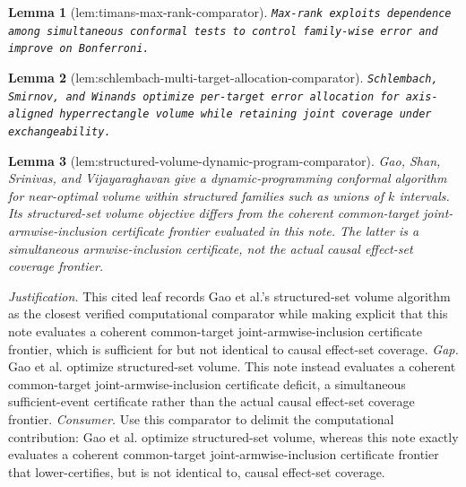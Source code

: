\documentclass{article}
\newtheorem{lemma}{Lemma}
\begin{document}
\begin{lemma}[lem:timans-max-rank-comparator]\label{lem:timans-max-rank-comparator}
\texttt{Max-\allowbreak{}rank exploits dependence among simultaneous conformal tests to control family-\allowbreak{}wise error and improve on Bonferroni.}
\end{lemma}

\begin{lemma}[lem:schlembach-multi-target-allocation-comparator]\label{lem:schlembach-multi-target-allocation-comparator}
\texttt{Schlembach,\allowbreak{} Smirnov,\allowbreak{} and Winands optimize per-\allowbreak{}target error allocation for axis-\allowbreak{}aligned hyperrectangle volume while retaining joint coverage under exchangeability.}
\end{lemma}

\begin{lemma}[lem:structured-volume-dynamic-program-comparator]\label{lem:structured-volume-dynamic-program-comparator}
Gao, Shan, Srinivas, and Vijayaraghavan give a dynamic-programming conformal algorithm for near-optimal volume within structured families such as unions of \(k\) intervals. Its structured-set volume objective differs from the coherent common-target joint-armwise-inclusion certificate frontier evaluated in this note. The latter is a simultaneous armwise-inclusion certificate, not the actual causal effect-set coverage frontier.
\end{lemma}
\par\smallskip\noindent \textit{Justification.} This cited leaf records Gao et al.'s structured-set volume algorithm as the closest verified computational comparator while making explicit that this note evaluates a coherent common-target joint-armwise-inclusion certificate frontier, which is sufficient for but not identical to causal effect-set coverage. \textit{Gap.} Gao et al. optimize structured-set volume. This note instead evaluates a coherent common-target joint-armwise-inclusion certificate deficit, a simultaneous sufficient-event certificate rather than the actual causal effect-set coverage frontier. \textit{Consumer.} Use this comparator to delimit the computational contribution: Gao et al. optimize structured-set volume, whereas this note exactly evaluates a coherent common-target joint-armwise-inclusion certificate frontier that lower-certifies, but is not identical to, causal effect-set coverage.
\end{document}
